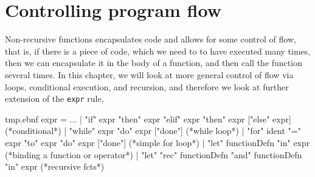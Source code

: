 \chapter{Controlling program flow}
\label{chap:flow}
Non-recursive functions encapsulates code and allows for some control of flow, that is, if there is a piece of code, which we need to to have executed many times, then we can encapsulate it in the body of a function, and then call the function several times. In this chapter, we will look at more general control of flow via loops, conditional execution, and recursion, and therefore we look at further extension of the \lstinline[language=ebnf]!expr! rule,
\begin{verbatimwrite}{tmp.ebnf}
expr = ... 
  | "if" expr "then" expr {"elif" expr "then" expr} ["else" expr] (*conditional*)
  | "while" expr "do" expr ["done"] (*while loop*)
  | "for" ident "=" expr "to" expr "do" expr ["done"] (*simple for loop*)
  | "let" functionDefn "in" expr (*binding a function or operator*)
  | "let" "rec" functionDefn {"and" functionDefn} "in" expr (*recursive fcts*)
\end{verbatimwrite}

